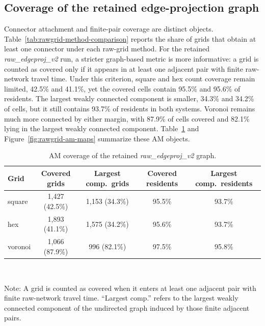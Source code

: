 \documentclass[12pt]{article}
\begin{document}
	\subsection{Coverage of the retained edge-projection graph}

	Connector attachment and finite-pair coverage are distinct objects. Table~\ref{tab:rawgrid-method-comparison} reports the share of grids that obtain at least one connector under each raw-grid method. For the retained \emph{raw\_edgeproj\_v2} run, a stricter graph-based metric is more informative: a grid is counted as covered only if it appears in at least one adjacent pair with finite raw-network travel time. Under this criterion, square and hex count coverage remain limited, 42.5\% and 41.1\%, yet the covered cells contain 95.5\% and 95.6\% of residents. The largest weakly connected component is smaller, 34.3\% and 34.2\% of cells, but it still contains 93.7\% of residents in both systems. Voronoi remains much more connected by either margin, with 87.9\% of cells covered and 82.1\% lying in the largest weakly connected component. Table~\ref{tab:rawgrid-coverage-am} and Figure~\ref{fig:rawgrid-am-maps} summarize these AM objects.

	\begin{table}[h!]
		\centering
		\caption{AM coverage of the retained \emph{raw\_edgeproj\_v2} graph.}
		\label{tab:rawgrid-coverage-am}
		\begin{tabular}{lcccc}
			\toprule
			Grid & Covered grids & Largest comp.\ grids & Covered residents & Largest comp.\ residents \\
			\midrule
			square  & 1,427 (42.5\%) & 1,153 (34.3\%) & 95.5\% & 93.7\% \\
			hex     & 1,893 (41.1\%) & 1,575 (34.2\%) & 95.6\% & 93.7\% \\
			voronoi & 1,066 (87.9\%) &   996 (82.1\%) & 97.5\% & 95.8\% \\
			\bottomrule
		\end{tabular} \\
		\vspace{0.3em}
		\begin{minipage}{\textwidth}
			\footnotesize
			\raggedright
			Note: A grid is counted as covered when it enters at least one adjacent pair with finite raw-network travel time. ``Largest comp.'' refers to the largest weakly connected component of the undirected graph induced by those finite adjacent pairs.
		\end{minipage}
	\end{table}
\end{document}
